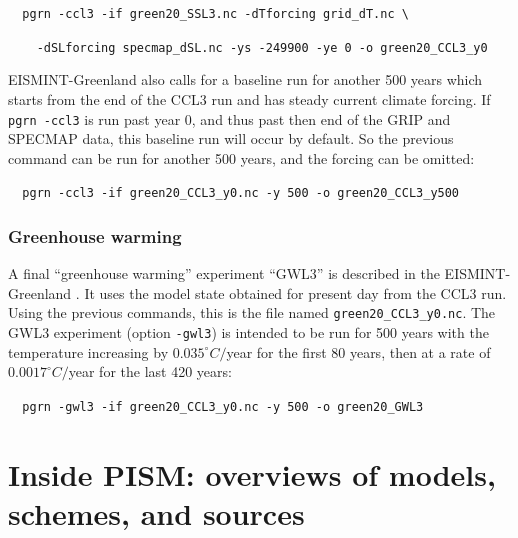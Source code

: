 \documentclass[11pt,final]{amsart}
\begin{document}
\verb|  pgrn -ccl3 -if green20_SSL3.nc -dTforcing grid_dT.nc \|

\verb|    -dSLforcing specmap_dSL.nc -ys -249900 -ye 0 -o green20_CCL3_y0|

\noindent EISMINT-Greenland also calls for a baseline run for another 500 years which starts from the end of the CCL3 run and has steady current climate forcing.  If \verb|pgrn -ccl3| is run past year 0, and thus past then end of the GRIP and SPECMAP data, this baseline run will occur by default.  So the previous command can be run for another 500 years, and the forcing can be omitted:

\verb|  pgrn -ccl3 -if green20_CCL3_y0.nc -y 500 -o green20_CCL3_y500|

\subsubsection{Greenhouse warming}  A final ``greenhouse warming'' experiment ``GWL3'' is described in the EISMINT-Greenland \cite{RitzEISMINT}.  It uses the model state obtained for present day from the CCL3 run.  Using the previous commands, this is the file named \verb|green20_CCL3_y0.nc|.  The GWL3 experiment (option \verb|-gwl3|) is intended to be run for 500 years with the temperature increasing by $0.035^\circ C/$year for the first 80 years, then at a rate of $0.0017^\circ C/$year for the last 420 years:

\verb|  pgrn -gwl3 -if green20_CCL3_y0.nc -y 500 -o green20_GWL3|


\clearpage\newpage
\section{Inside PISM: overviews of models, schemes, and sources}\label{sect:over}
\end{document}
